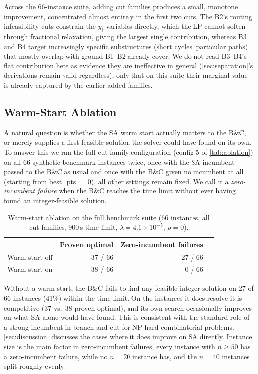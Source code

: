 \documentclass[11pt,a4paper]{article}
\begin{document}
Across the 66-instance suite, adding cut families produces a small, monotone improvement, concentrated almost entirely in the first two cuts.
The B2's routing infeasibility cuts constrain the $y_i$ variables directly, which the LP cannot soften through fractional relaxation, giving the largest single contribution, whereas B3 and B4 target increasingly specific substructures (short cycles, particular paths) that mostly overlap with ground B1--B2 already cover.
We do not read B3--B4's flat contribution here as evidence they are ineffective in general (\cref{sec:separation}'s derivations remain valid regardless), only that on this suite their marginal value is already captured by the earlier-added families.

\subsection{Warm-Start Ablation}
\label{sec:warmstart_ablation}

A natural question is whether the SA warm start actually matters to the B\&C, or merely supplies a first feasible solution the solver could have found on its own.
To answer this we run the full-cut-family configuration (config 5 of \cref{tab:ablation}) on all 66 synthetic benchmark instances twice, once with the SA incumbent passed to the B\&C as usual and once with the B\&C given no incumbent at all (starting from best\_pts $= 0$), all other settings remain fixed.
We call it a \emph{zero-incumbent failure} when the B\&C reaches the time limit without ever having found an integer-feasible solution.

\begin{table}[H]
\centering
\caption{Warm-start ablation on the full benchmark suite (66 instances, all cut families, 900\,s time limit, $\lambda = 4.1\times10^{-5}$, $\rho = 0$).}
\label{tab:warmstart_ablation}
\begin{tabular}{lrrr}
\toprule
& \textbf{Proven optimal} & \textbf{Zero-incumbent failures} \\
\midrule
Warm start off & 37 / 66 & 27 / 66 \\
Warm start on  & 38 / 66 &  0 / 66 \\
\bottomrule
\end{tabular}
\end{table}

Without a warm start, the B\&C fails to find any feasible integer solution on 27 of 66 instances (41\%) within the time limit.
On the instances it does resolve it is competitive (37 vs.\ 38 proven optimal), and its own search occasionally improves on what SA alone would have found.
This is consistent with the standard role of a strong incumbent in branch-and-cut for NP-hard combinatorial problems. \cref{sec:discussion} discusses the cases where it does improve on SA directly.
Instance size is the main factor in zero-incumbent failures, 
every instance with $n \geq 50$ has a zero-incumbent failure, while no $n=20$ instance has, and the $n=40$ instances split roughly evenly.
\end{document}
